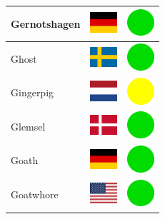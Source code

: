 \documentclass[12pt, a4paper, twoside]{report}
\begin{document}
\begin{center}
\begin{longtable}{|p{5cm}|p{2cm}|p{2cm}|}
 Gernotshagen                                               & \includegraphics[width=1cm]{../img/flags/de} &   \includegraphics[width=1cm]{../likes/y} \\ \hline
 Ghost                                                      & \includegraphics[width=1cm]{../img/flags/se} &   \includegraphics[width=1cm]{../likes/y} \\ \hline
 Gingerpig                                                  & \includegraphics[width=1cm]{../img/flags/nl} &   \includegraphics[width=1cm]{../likes/m} \\ \hline
 Glemsel                                                    & \includegraphics[width=1cm]{../img/flags/dk} &   \includegraphics[width=1cm]{../likes/y} \\ \hline
 Goath                                                      & \includegraphics[width=1cm]{../img/flags/de} &   \includegraphics[width=1cm]{../likes/y} \\ \hline
 Goatwhore                                                  & \includegraphics[width=1cm]{../img/flags/us} &   \includegraphics[width=1cm]{../likes/y} \\ \hline

\end{longtable}
\end{center}
\end{document}
